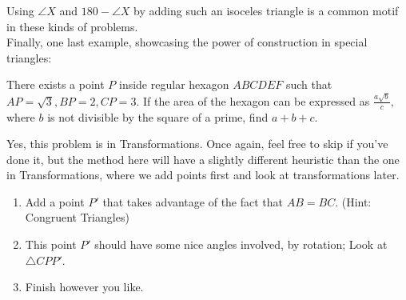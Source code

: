 \documentclass[11pt]{article}
\begin{document}
Using $\angle X$ and $180-\angle X$ by adding such an isoceles triangle is a common motif in these kinds of problems.\\
Finally, one last example, showcasing the power of construction in special triangles:\\
\begin{exam}
There exists a point $P$ inside regular hexagon $ABCDEF$ such that $AP=\sqrt{3},BP=2,CP=3.$ If the area of the hexagon can be expressed as $\frac{a\sqrt{b}}{c},$ where $b$ is not divisible by the square of a prime, find $a+b+c.$
\end{exam}
Yes, this problem is in Transformations. Once again, feel free to skip if you've done it, but the method here will have a slightly different heuristic than the one in Transformations, where we add points first and look at transformations later.\\
\begin{walk}
    \begin{enumerate}
        \item Add a point $P'$ that takes advantage of the fact that $AB = BC$. (Hint: Congruent Triangles)
        \item This point $P'$ should have some nice angles involved, by rotation; Look at $\triangle CPP'$. 
        \item Finish however you like.
    \end{enumerate}
\end{walk}
\end{document}
